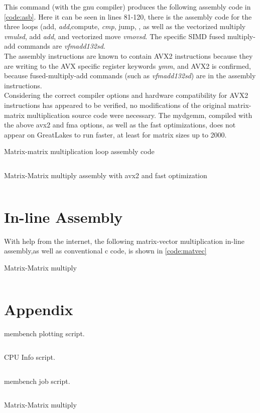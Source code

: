 \documentclass[letterpaper]{article}
\newenvironment{longlisting}{\captionsetup{type=listing}}{}
\newcommand{\code}[4]{
\begin{longlisting}
    \caption{#3}
    \inputminted[linenos]{#1}{#2}
    \label{code:#4}
\end{longlisting}
}
\begin{document}
This command (with the gnu compiler) produces the following assembly code in \cref{code:asb}. Here it can be seen in lines 81-120, there is the assembly code for the three loops (add, \textit{add},compute, \textit{cmp}, jump, , as well as the vectorized multiply \textit{vmulsd}, add \textit{add}, and vectorized move \textit{vmovsd}. The specific SIMD fused multiply-add commands are \textit{vfmadd132sd}. \\

The assembly instructions are known to contain AVX2 instructions because they are writing to the AVX specific register keywords \textit{ymm}, and AVX2 is confirmed, because fused-multiply-add commands (such as \textit{vfmadd132sd}) are in the assembly instructions.\\

Considering the correct compiler options and hardware compatibility for AVX2 instructions has appeared to be verified, no modifications of the original matrix-matrix multiplication source code were necessary. The mydgemm, compiled with the above avx2 and fma options, as well as the fast optimizations, does not appear on GreatLakes to run faster, at least for matrix sizes up to 2000.


\begin{longlisting}
    \caption{Matrix-matrix multiplication loop assembly code}
    \inputminted[linenos,firstline=81,lastline=120]{bash}{figures/dgemm.s}
    \label{code:asb_}
\end{longlisting}


\code{cpp}{figures/dgemm.s}{Matrix-Matrix multiply assembly with avx2 and fast optimization}{asb}






\newpage
\section{In-line Assembly}
With help from the internet, the following matrix-vector multiplication in-line assembly,as well as conventional c code, is shown in \cref{code:matvec}
\code{c}{figures/matvec.c}{Matrix-Matrix multiply}{dgemm}








\newpage
\section{Appendix}
\appendix
\begin{appendix}
\code{python}{figures/membench.py}{membench plotting script.}{membench}
\newpage
\code{bash}{figures/calc.sh}{CPU Info script.}{calc}
\newpage
\code{bash}{figures/job.slurm}{membench job script.}{job}
\newpage
\code{cpp}{figures/dgemm.cpp}{Matrix-Matrix multiply}{dgemm}
\end{appendix}


\end{document}
